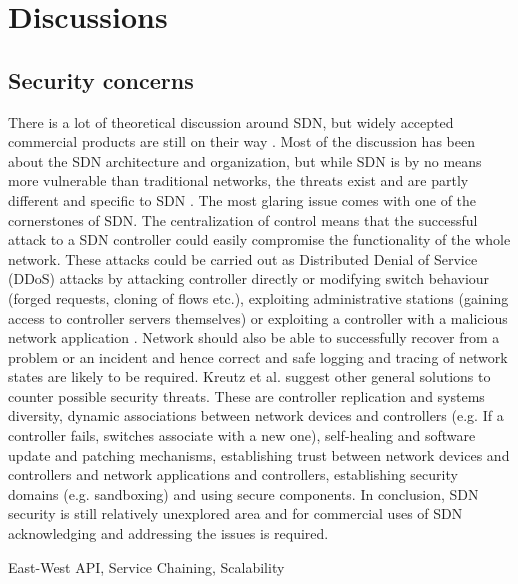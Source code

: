 \section{Discussions}

\subsection{Security concerns}

There is a lot of theoretical discussion around SDN, but widely accepted commercial products are still on their way \cite{Sorensen12}. Most of the discussion has been about the SDN architecture and organization, but while SDN is by no means more vulnerable than traditional networks, the threats exist and are partly different and specific to SDN \cite{Kreutz13}. The most glaring issue comes with one of the cornerstones of SDN. The centralization of control means that the successful attack to a SDN controller could easily compromise the functionality of the whole network. These attacks could be carried out as Distributed Denial of Service (DDoS) attacks by attacking controller directly or modifying switch behaviour (forged requests, cloning of flows etc.), exploiting administrative stations (gaining access to controller servers themselves) or exploiting a controller with a malicious network application  \cite{Kreutz13}. Network should also be able to successfully recover from a problem or an incident and hence correct and safe logging and tracing of network states are likely to be required.
Kreutz et al. suggest other general solutions to counter possible security threats. These are controller replication and systems diversity, dynamic associations between network devices and controllers (e.g. If a controller fails, switches associate with a new one), self-healing and software update and patching mechanisms, establishing trust between network devices and controllers and network applications and controllers, establishing security domains (e.g. sandboxing) and using secure components. In conclusion, SDN security is still relatively unexplored area and for commercial uses of SDN acknowledging and addressing the issues is required.


East-West API, Service Chaining, Scalability
